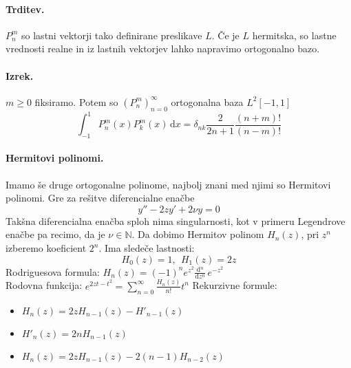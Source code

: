 \documentclass[a4paper]{article}
\newcommand{\dif}{\mathrm{d}}
\newcommand{\dd}[2]{\frac{\mathrm{d} {#1}}{\mathrm{d} {#2}}}
\newcommand{\N}{\mathbb{N}}
\newcommand{\Sum}[2][0]{\sum_{{#2} = {#1}}^{\infty}}
\begin{document}
\paragraph{Trditev.} $P_n^m$ so lastni vektorji tako definirane preslikave $L$. Če je $L$ hermitska, so lastne vrednosti realne in iz lastnih vektorjev lahko napravimo
ortogonalno bazo.
\paragraph{Izrek.} $m \geq 0$ fiksiramo. Potem so $\left(P_n^m\right)_{n=0}^\infty$ ortogonalna baza $L^2[-1, 1]$
$$\int_{-1}^{1} P_n^m(x)P_k^m(x)\,\dif x = \delta_{nk}\frac{2}{2n+1}\frac{(n+m)!}{(n-m)!}$$
\paragraph{Hermitovi polinomi.} Imamo še druge ortogonalne polinome, najbolj znani med njimi so Hermitovi polinomi. Gre za rešitve diferencialne enačbe
$$y'' - 2zy' + 2\nu y = 0$$
Takšna diferencialna enačba sploh nima singularnosti, kot v primeru Legendrove enačbe pa recimo, da je $\nu \in \N$. Da dobimo Hermitov polinom $H_n(z)$, pri $z^n$ izberemo koeficient $2^n$. Ima sledeče lastnosti:
$$H_0(z) = 1,~~H_1(z) = 2z$$
Rodriguesova formula: $\displaystyle{H_n(z) = (-1)^n e^{z^2}\dd{^n}{z^n}\,e^{-z^2}}$ \\
Rodovna funkcija: $\displaystyle{e^{2zt - t^2} = \Sum{n} \frac{H_n(z)}{n!}t^n}$
Rekurzivne formule:
\begin{itemize}
    \item $H_n(z) = 2zH_{n-1}(z) - H'_{n-1}(z)$
    \item $H'_n(z) = 2nH_{n-1}(z)$
    \item $H_n(z) = 2zH_{n-1}(z) - 2(n-1)H_{n-2}(z)$
\end{itemize}
\end{document}
